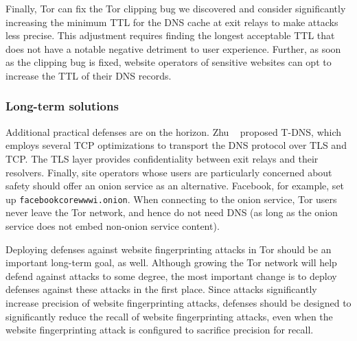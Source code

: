 Finally, Tor can fix the Tor clipping bug we discovered and consider
significantly increasing the minimum TTL for the DNS cache at exit relays to
make \name attacks less precise.  This adjustment requires finding the longest
acceptable TTL that does not have a notable negative detriment to user
experience.  Further, as soon as the clipping bug is fixed, website operators
of sensitive websites can opt to increase the TTL of their DNS records.

\subsubsection{Long-term solutions}
\label{sec:long-term}

Additional practical defenses are on the horizon.  Zhu \ea~\cite{Zhu2015a}
proposed T-DNS, which employs several TCP optimizations to transport the DNS
protocol over TLS and TCP.  The TLS layer provides confidentiality between exit
relays and their resolvers.  Finally, site operators whose users are
particularly concerned about safety should offer an onion service as an
alternative.  Facebook, for example, set up {\tt facebookcorewwwi.onion}.  When
connecting to the onion service, Tor users never leave the Tor network, and
hence do not need DNS (as long as the onion service does not embed non-onion
service content).

Deploying defenses against website fingerprinting attacks in Tor should be an
important long-term goal, as well.
Although growing the Tor network will help defend against \name attacks to some
degree, the most important change is to
deploy defenses against these attacks in the first place.  Since \name attacks
significantly increase precision of website fingerprinting attacks, defenses
should be designed to significantly reduce the recall of website fingerprinting
attacks, even when the website fingerprinting attack is configured to sacrifice
precision for recall.
